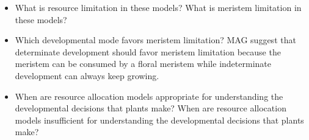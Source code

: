 \documentclass[12pt, oneside]{article}   	%
\begin{document}
\begin{itemize}
\item What is resource limitation in these models? What is meristem limitation in these models? 

\item Which developmental mode favors meristem limitation? MAG suggest that determinate development should favor meristem limitation because the meristem can be consumed by a floral meristem while indeterminate development can always keep growing.

\item When are resource allocation models appropriate for understanding the developmental decisions that plants make? When are resource allocation models insufficient for understanding the developmental decisions that plants make?





\end{itemize}
\end{document}
